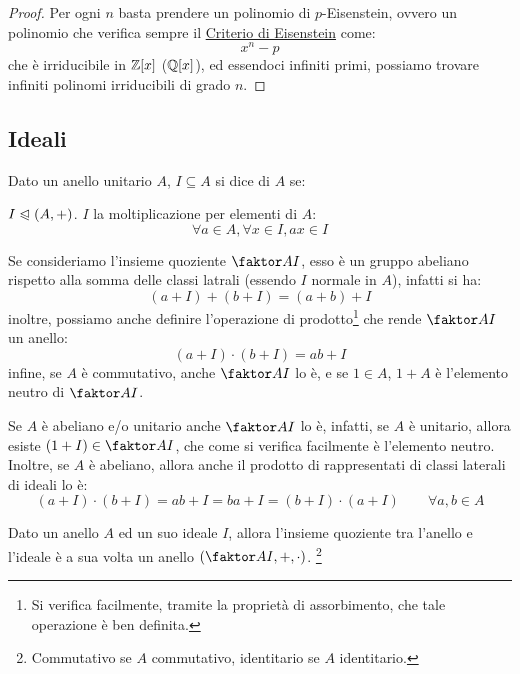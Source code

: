 \documentclass[11pt]{scrartcl}
\begin{document}
\begin{proof}
Per ogni $n$ basta prendere un polinomio di $p$-Eisenstein, ovvero un polinomio che verifica sempre il \hyperref[p:eisen]{Criterio di Eisenstein} come:
	\[ x^n - p
	\]
che è irriducibile in $\mathbb Z[x]$ ($\mathbb Q[x]$), ed essendoci infiniti primi, possiamo trovare infiniti polinomi irriducibili di grado $n$.
\end{proof}

\newpage

\subsection{Ideali}

\begin{definition}
Dato un anello unitario $A$, $I \subseteq A$ si dice  di $A$ se:
	\begin{itemize}
	\ii $I \trianglelefteqslant (A,+)$.
	\ii $I$  la moltiplicazione per elementi di $A$:
		\[ \forall a \in A, \forall x \in I, ax \in I
		\]
	\end{itemize}
\end{definition}

Se consideriamo l'insieme quoziente $\faktor AI$, esso è un gruppo abeliano rispetto alla somma delle classi latrali (essendo $I$ normale in $A$), infatti si ha:	
	\[ (a + I) + (b + I) = (a + b) + I
	\]
inoltre, possiamo anche definire l'operazione di prodotto\footnote{Si verifica facilmente, tramite la proprietà di assorbimento, che tale operazione è ben definita.} che rende $\faktor AI$ un anello:
	\[ (a + I) \cdot (b + I) = ab + I
	\]
infine, se $A$ è commutativo, anche $\faktor AI$ lo è, e se $1 \in A$, $1+A$ è l'elemento neutro di $\faktor AI$.

\begin{remark}
\label{p:3.49}
Se $A$ è abeliano e/o unitario anche $\faktor AI$ lo è, infatti, se $A$ è unitario, allora esiste $(1+I) \in \faktor AI$, che come si verifica facilmente è l'elemento neutro. Inoltre, se $A$ è abeliano, allora anche il prodotto di rappresentati di classi laterali di ideali lo è:
	\[ (a + I) \cdot (b + I) = ab + I = ba + I = (b + I) \cdot (a + I)
	\qquad \forall a,b \in A
	\]
\end{remark}

\begin{proposition}
\label{p:3.50}
Dato un anello $A$ ed un suo ideale $I$, allora l'insieme quoziente tra l'anello e l'ideale è a sua volta un anello $\left(\faktor AI, +, \cdot\right)$. \footnote{Commutativo se $A$ commutativo, identitario se $A$ identitario.}
\end{proposition}
\end{document}
